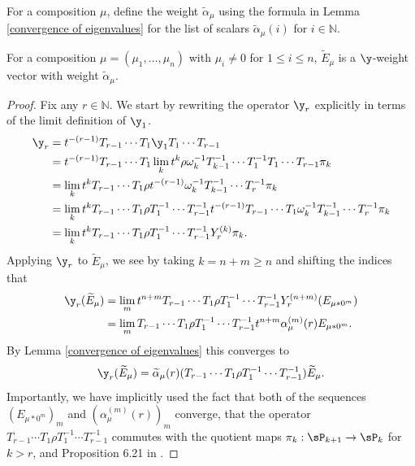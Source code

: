 For a composition $\mu$, define the weight $\widetilde{\alpha}_{\mu}$ using the formula in Lemma \ref{convergence of eigenvalues} for the list of scalars  $\widetilde{\alpha}_{\mu}(i)$ for $i \in \mathbb{N}$.

\begin{lemm} \label{weight vector if nonzero parts}
For a composition $\mu = (\mu_1,\ldots,\mu_n)$ with $\mu_i \neq 0$ for $1\leq i \leq n$, $\widetilde{E}_{\mu}$ is a $\y$-weight vector with weight $\widetilde{\alpha}_{\mu}$. 
\end{lemm}

\begin{proof}
Fix any $r \in \mathbb{N}$. We start by rewriting the operator $\y_r$ explicitly in terms of the limit definition of $\y_1$.
\begin{align*}
\y_r &= t^{-(r-1)}T_{r-1}\cdots T_1 \y_1 T_1 \cdots T_{r-1}\\
&= t^{-(r-1)}T_{r-1}\cdots T_1 \lim_{k} t^{k} \rho \omega_k ^{-1} T_{k-1}^{-1}\cdots T_{1}^{-1}T_1\cdots T_{r-1} \pi_k \\
&= \lim_{k} t^{k} T_{r-1}\cdots T_1 \rho t^{-(r-1)} \omega_k ^{-1} T_{k-1}^{-1}\cdots T_{r}^{-1}\pi_k \\
&= \lim_{k} t^{k} T_{r-1}\cdots T_1 \rho T_1^{-1} \cdots T_{r-1}^{-1} t^{-(r-1)} T_{r-1} \cdots T_{1}  \omega_k ^{-1} T_{k-1}^{-1}\cdots T_{r}^{-1} \pi_k \\
&= \lim_{k} t^{k} T_{r-1}\cdots T_1 \rho T_1^{-1} \cdots T_{r-1}^{-1} Y_{r}^{(k)}\pi_k.
\end{align*}
Applying $\y_r$ to $\widetilde{E}_{\mu}$, we see by taking $k = n+m \geq n$ and shifting the indices that
\begin{align*}
\y_r(\widetilde{E}_{\mu}) &= \lim_{m} t^{n+m} T_{r-1}\cdots T_1 \rho T_1^{-1} \cdots T_{r-1}^{-1} Y_{r}^{(n+m)}(E_{\mu*0^{m}}) \\
&= \lim_{m} T_{r-1}\cdots T_1 \rho T_1^{-1} \cdots T_{r-1}^{-1}  t^{n+m} \alpha_{\mu}^{(m)}(r) E_{\mu*0^{m}}.
\end{align*}
By Lemma \ref{convergence of eigenvalues} this converges to 
$$ \y_r( \widetilde{E}_{\mu}) = \widetilde{\alpha}_{\mu}(r) (T_{r-1}\cdots T_1 \rho T_1^{-1}\cdots T_{r-1}^{-1}) \widetilde{E}_{\mu} .$$ 
Importantly, we have implicitly used the fact that both of the sequences $(E_{\mu*0^{m}})_{m}$ and $(\alpha_{\mu}^{(m)}(r))_{m}$ converge, that the operator $T_{r-1}\cdots T_1 \rho T_1^{-1}\cdots T_{r-1}^{-1}$ commutes with the quotient maps $\pi_k: \sP_{k+1} \rightarrow \sP_{k}$ for $k> r$, and Proposition 6.21 in \cite{Ion_2022}.

\end{proof}
